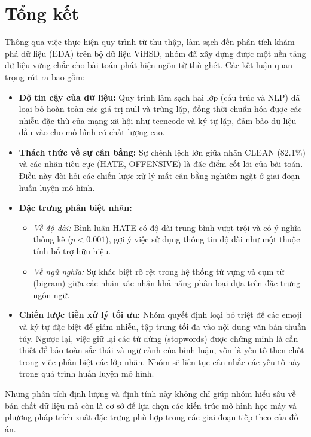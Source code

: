 \section{Tổng kết}
Thông qua việc thực hiện quy trình từ thu thập, làm sạch đến phân tích khám phá dữ liệu (EDA) trên bộ dữ liệu ViHSD, nhóm đã xây dựng được một nền tảng dữ liệu vững chắc cho bài toán phát hiện ngôn từ thù ghét. Các kết luận quan trọng rút ra bao gồm:

\begin{itemize}
    \item \textbf{Độ tin cậy của dữ liệu:} Quy trình làm sạch hai lớp (cấu trúc và NLP) đã loại bỏ hoàn toàn các giá trị null và trùng lặp, đồng thời chuẩn hóa được các nhiễu đặc thù của mạng xã hội như teencode và ký tự lặp, đảm bảo dữ liệu đầu vào cho mô hình có chất lượng cao.
    \item \textbf{Thách thức về sự cân bằng:} Sự chênh lệch lớn giữa nhãn CLEAN (82.1\%) và các nhãn tiêu cực (HATE, OFFENSIVE) là đặc điểm cốt lõi của bài toán. Điều này đòi hỏi các chiến lược xử lý mất cân bằng nghiêm ngặt ở giai đoạn huấn luyện mô hình.
    \item \textbf{Đặc trưng phân biệt nhãn:}
          \begin{itemize}
              \item \textit{Về độ dài:} Bình luận HATE có độ dài trung bình vượt trội và có ý nghĩa thống kê ($p < 0.001$), gợi ý việc sử dụng thông tin độ dài như một thuộc tính bổ trợ hữu hiệu.
              \item \textit{Về ngữ nghĩa:} Sự khác biệt rõ rệt trong hệ thống từ vựng và cụm từ (bigram) giữa các nhãn xác nhận khả năng phân loại dựa trên đặc trưng ngôn ngữ.
          \end{itemize}
    \item \textbf{Chiến lược tiền xử lý tối ưu:} Nhóm quyết định loại bỏ triệt để các emoji và ký tự đặc biệt để giảm nhiễu, tập trung tối đa vào nội dung văn bản thuần túy. Ngược lại, việc giữ lại các từ dừng (stopwords) được chứng minh là cần thiết để bảo toàn sắc thái và ngữ cảnh của bình luận, vốn là yếu tố then chốt trong việc phân biệt các lớp nhãn. Nhóm sẽ liên tục cân nhắc các yếu tố này trong quá trình huấn luyện mô hình.
\end{itemize}

Những phân tích định lượng và định tính này không chỉ giúp nhóm hiểu sâu về bản chất dữ liệu mà còn là cơ sở để lựa chọn các kiến trúc mô hình học máy và phương pháp trích xuất đặc trưng phù hợp trong các giai đoạn tiếp theo của đồ án.